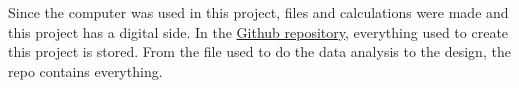 Since the computer was used in this project, files and calculations were made and this project has a digital side. In the \href{https://github.com/betacademia/albatross}{Github repository}, everything used to create this project is stored. From the file used to do the data analysis to the design, the repo contains everything.